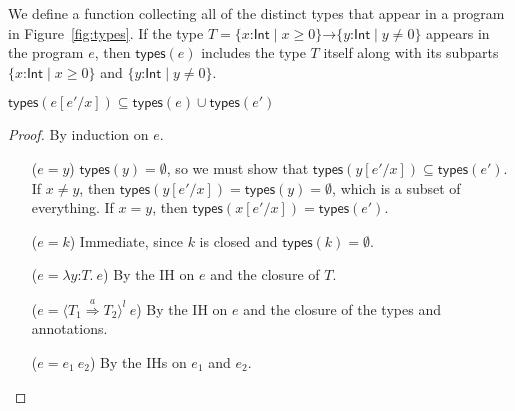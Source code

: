 \documentclass[9pt]{extarticle}
\newcommand{\ottnt}[1]{\mathit{#1}}
\newcommand{\ottsym}[1]{#1}
\begin{document}
We define a function collecting all of the distinct types that appear
in a program in Figure~\ref{fig:types}. If the type $\ottnt{T}  \ottsym{=}    \{ \mathit{x} \mathord{:}  \mathsf{Int}  \mathrel{\mid}  \mathit{x}  \mathrel{\ge}  \ottsym{0}  \}  \mathord{ \rightarrow }  \{ \mathit{y} \mathord{:}  \mathsf{Int}  \mathrel{\mid}  \mathit{y}  \mathrel{\ne}  \ottsym{0}  \}  $ appears in the program $\ottnt{e}$, then
$ \mathsf{types} ( \ottnt{e} ) $ includes the type $\ottnt{T}$ itself along with its
subparts $ \{ \mathit{x} \mathord{:}  \mathsf{Int}  \mathrel{\mid}  \mathit{x}  \mathrel{\ge}  \ottsym{0}  \} $ and $ \{ \mathit{y} \mathord{:}  \mathsf{Int}  \mathrel{\mid}  \mathit{y}  \mathrel{\ne}  \ottsym{0}  \} $.
\begin{lemma}
  \label{lem:typessubstitution}
  $ \mathsf{types} (  \ottnt{e}  [  \ottnt{e'} / \mathit{x}  ]  )  \subseteq   \mathsf{types} ( \ottnt{e} )   \cup   \mathsf{types} ( \ottnt{e'} )  $
\begin{proof}
    By induction on $\ottnt{e}$.
{\iffull
    \begin{itemize}
    \item[($\ottnt{e}  \ottsym{=}  \mathit{y}$)] $ \mathsf{types} ( \mathit{y} )  =  \emptyset $, so we must show
      that $  \mathsf{types} (  \mathit{y}  [  \ottnt{e'} / \mathit{x}  ]  )   \subseteq   \mathsf{types} ( \ottnt{e'} )  $. If $\mathit{x}  \neq  \mathit{y}$, then
      $ \mathsf{types} (  \mathit{y}  [  \ottnt{e'} / \mathit{x}  ]  )   \ottsym{=}   \mathsf{types} ( \mathit{y} )  =  \emptyset $, which is a subset
      of everything. If $\mathit{x}  \ottsym{=}  \mathit{y}$, then $ \mathsf{types} (  \mathit{x}  [  \ottnt{e'} / \mathit{x}  ]  )   \ottsym{=}   \mathsf{types} ( \ottnt{e'} ) $.
    \item[($\ottnt{e}  \ottsym{=}  \ottnt{k}$)] Immediate, since $\ottnt{k}$ is closed and
      $ \mathsf{types} ( \ottnt{k} )  =  \emptyset $.
    \item[($\ottnt{e}  \ottsym{=}   \lambda \mathit{y} \mathord{:} \ottnt{T} .~  \ottnt{e} $)] By the IH on $\ottnt{e}$ and the closure of
      $\ottnt{T}$.
    \item[($\ottnt{e}  \ottsym{=}   \langle  \ottnt{T_{{\mathrm{1}}}}  \mathord{ \overset{ \ottnt{a} }{\Rightarrow} }  \ottnt{T_{{\mathrm{2}}}}  \rangle^{ \ottnt{l} } ~  \ottnt{e} $)] By the IH on $\ottnt{e}$ and the
      closure of the types and annotations.
    \item[($\ottnt{e}  \ottsym{=}   \ottnt{e_{{\mathrm{1}}}} ~ \ottnt{e_{{\mathrm{2}}}} $)] By the IHs on $\ottnt{e_{{\mathrm{1}}}}$ and $\ottnt{e_{{\mathrm{2}}}}$.

\end{itemize}}
\end{proof}
\end{lemma}
\end{document}
